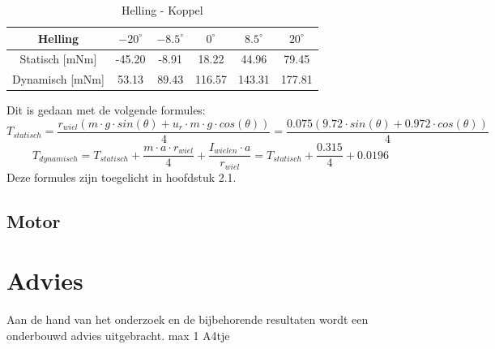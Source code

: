 \documentclass{article}
\begin{document}
            \begin{table}[h]
                \centering
                \begin{tabular}{|c|c|c|c|c|c|}
                \hline
                Helling & $-20 ^\circ$ & $-8.5 ^\circ$ & $0 ^\circ$ & $8.5 ^\circ$ & $20 ^\circ$ \\ \hline
                Statisch [mNm]  & -45.20   & -8.91   & 18.22   & 44.96  & 79.45   \\ \hline
                Dynamisch [mNm]  & 53.13  & 89.43   & 116.57  & 143.31  & 177.81  \\ \hline
                \end{tabular}
                \caption{Helling - Koppel}
                \label{tab}
            \end{table}
            Dit is gedaan met de volgende formules:
            $$T_{statisch} = \frac{r_{wiel}(m \cdot g \cdot sin(\theta) + u_r \cdot m \cdot g \cdot cos(\theta))}{4} = \frac{0.075(9.72 \cdot sin(\theta) +  0.972 \cdot cos(\theta))}{4}$$
            $$T_{dynamisch} = T_{statisch} + \frac{m \cdot a \cdot r_{wiel}}{4} + \frac{I_{wielen} \cdot a}{r_{wiel}} = T_{statisch} + \frac{0.315}{4}+ 0.0196 $$
            Deze formules zijn toegelicht in hoofdstuk 2.1.    
            
        \subsection{Motor}
            


    \section{Advies}
        Aan de hand van het onderzoek en de
        bijbehorende resultaten wordt een onderbouwd
        advies uitgebracht. max 1 A4tje

    \appendix
\end{document}
